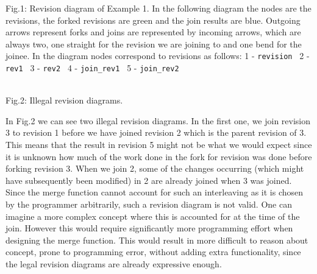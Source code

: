 \documentclass[12pt,twoside,notitlepage]{report}
\begin{document}
Fig.1: Revision diagram of Example 1. In the following diagram the nodes are the revisions, the forked revisions are green and the join results are blue. Outgoing arrows represent forks and  joins are represented by incoming arrows, which are always two, one straight for the revision we are joining to and one bend for the joinee. In the diagram nodes correspond to revisions as follows: 1 - {\tt revision } 2 - {\tt rev1 } 3 - {\tt rev2 } 4 - {\tt join\_rev1 } 5 - {\tt join\_rev2}  

\\Fig.2: Illegal revision diagrams.
\vspace{10pt}

In Fig.2 we can see two illegal revision diagrams. In the first one, we join revision 3 to revision 1 before we have joined revision 2 which is the parent revision of 3. This means that the result in revision 5 might not be what we would expect since it is unknown how much of the work done in the fork for revision was done before forking revision 3. When we join 2, some of the changes occurring (which might have subsequently been modified) in 2 are already joined when 3 was joined. Since the merge function cannot account for such an interleaving as it is chosen by the programmer arbitrarily, such a revision diagram is not valid. One can imagine a more complex concept where this is accounted for at the time of the join. However this would require significantly more programming effort when designing the merge function. This would result in more difficult to reason about concept, prone to programming error, without adding extra functionality, since the legal revision diagrams are already expressive enough. 
\end{document}
